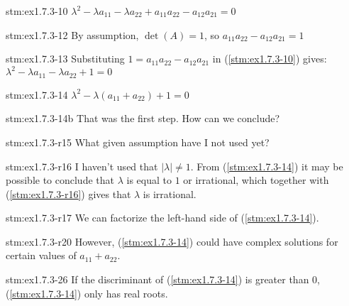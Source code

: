 \begin{statement}{stm:ex1.7.3-10}
$\lambda^2 - \lambda a_{11} - \lambda a_{22} + a_{11}a_{22} - a_{12}a_{21} = 0$
\end{statement}

\begin{statement}{stm:ex1.7.3-12}
By assumption, $\det(A) = 1$, so $a_{11}a_{22} - a_{12}a_{21} = 1$
\end{statement}

\begin{statement}{stm:ex1.7.3-13}
Substituting $1 = a_{11}a_{22} - a_{12}a_{21}$ in (\ref{stm:ex1.7.3-10}) gives: $\lambda^2 - \lambda a_{11} - \lambda a_{22} + 1 = 0$
\end{statement}

\begin{statement}{stm:ex1.7.3-14}
$\lambda^2 - \lambda(a_{11} + a_{22}) + 1 = 0$
\end{statement}

\begin{explanation}{stm:ex1.7.3-14b}
That was the first step. How can we conclude?
\end{explanation}

\begin{explanation}{stm:ex1.7.3-r15}
What given assumption have I not used yet?
\end{explanation}

\begin{explanation}{stm:ex1.7.3-r16}
I haven't used that $|\lambda| \ne 1$. From (\ref{stm:ex1.7.3-14}) it may be possible to conclude that $\lambda$ is equal to $1$ or irrational, which together with (\ref{stm:ex1.7.3-r16}) gives that $\lambda$ is irrational.
\end{explanation}

\begin{explanation}{stm:ex1.7.3-r17}
We can factorize the left-hand side of (\ref{stm:ex1.7.3-14}).
\end{explanation}

\begin{explanation}{stm:ex1.7.3-r20}
However, (\ref{stm:ex1.7.3-14}) could have complex solutions for certain values of $a_{11} + a_{22}$.
\end{explanation}

\begin{explanation}{stm:ex1.7.3-26}
If the discriminant of (\ref{stm:ex1.7.3-14}) is greater than $0$, (\ref{stm:ex1.7.3-14}) only has real roots.
\end{explanation}

